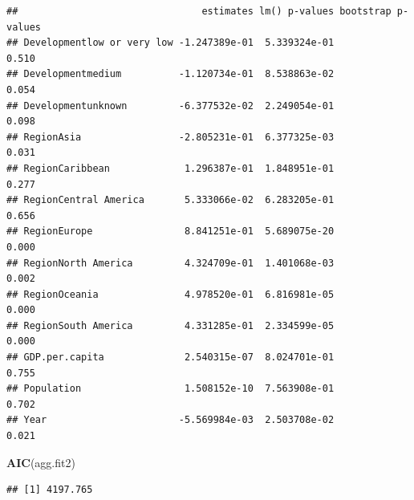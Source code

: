\documentclass[11pt,]{article}
\newenvironment{Shaded}{\begin{snugshade}}{\end{snugshade}}
\newcommand{\CommentTok}[1]{\textcolor[rgb]{0.56,0.35,0.01}{\textit{#1}}}
\newcommand{\DecValTok}[1]{\textcolor[rgb]{0.00,0.00,0.81}{#1}}
\newcommand{\KeywordTok}[1]{\textcolor[rgb]{0.13,0.29,0.53}{\textbf{#1}}}
\newcommand{\NormalTok}[1]{#1}
\newcommand{\OperatorTok}[1]{\textcolor[rgb]{0.81,0.36,0.00}{\textbf{#1}}}
\newcommand{\StringTok}[1]{\textcolor[rgb]{0.31,0.60,0.02}{#1}}
\begin{document}
\begin{Shaded}
\end{Shaded}

\begin{verbatim}
##                                estimates lm() p-values bootstrap p-values
## Developmentlow or very low -1.247389e-01  5.339324e-01              0.510
## Developmentmedium          -1.120734e-01  8.538863e-02              0.054
## Developmentunknown         -6.377532e-02  2.249054e-01              0.098
## RegionAsia                 -2.805231e-01  6.377325e-03              0.031
## RegionCaribbean             1.296387e-01  1.848951e-01              0.277
## RegionCentral America       5.333066e-02  6.283205e-01              0.656
## RegionEurope                8.841251e-01  5.689075e-20              0.000
## RegionNorth America         4.324709e-01  1.401068e-03              0.002
## RegionOceania               4.978520e-01  6.816981e-05              0.000
## RegionSouth America         4.331285e-01  2.334599e-05              0.000
## GDP.per.capita              2.540315e-07  8.024701e-01              0.755
## Population                  1.508152e-10  7.563908e-01              0.702
## Year                       -5.569984e-03  2.503708e-02              0.021
\end{verbatim}

\begin{Shaded}
\begin{Highlighting}[]
\KeywordTok{AIC}\NormalTok{(agg.fit2)}
\end{Highlighting}
\end{Shaded}

\begin{verbatim}
## [1] 4197.765
\end{verbatim}
\end{document}
